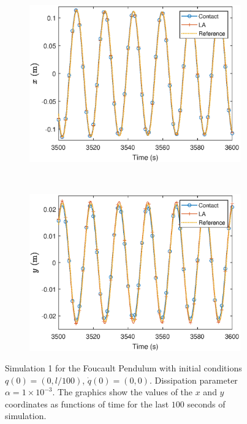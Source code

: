 \documentclass{aims}
\numberwithin{equation}{section}
\theoremstyle{definition}
\begin{document}
\begin{figure}
  \centering
  \begin{subfigure}[b]{0.65\textwidth}
    \centering
    \includegraphics[width=\textwidth]{fig/x-alpha0001.eps}
  \end{subfigure} \\
  \begin{subfigure}[b]{0.65\textwidth}
    \centering
    \includegraphics[width=\textwidth]{fig/y-alpha0001.eps}
  \end{subfigure}
  \caption{Simulation 1 for the Foucault Pendulum with initial conditions $q(0) = (0,l/100)$, $\dot{q}(0) = (0,0)$. Dissipation parameter $\alpha = 1 \times 10^{-3}$. The graphics show the values of the $x$ and $y$ coordinates as functions of time for the last $100$ seconds of simulation.}
  \label{fig:foucault_sim_1_trayectories}
\end{figure}
\end{document}
